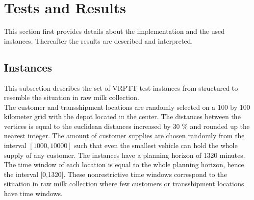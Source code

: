 \section{Tests and Results}
\label{chap:Tests and Results}

This section first provides details about the implementation and the used instances. Thereafter the results are described and interpreted.\\







\subsection{Instances}


This subsection describes the set of VRPTT test instances  from \cite{drexl2014bandc}   structured to resemble the situation in raw milk collection.
\\

The customer and transshipment locations are randomly selected on a 100 by 100 kilometer grid with the depot located in the center.
The distances between the vertices is equal to the euclidean distances increased by 30 \% and rounded up the nearest integer.
%
The amount of customer supplies are chosen randomly from the interval $[1000 , 10000]$ such that even the smallest vehicle can hold the whole supply of any customer.
%
The instances have a planning horizon of 1320 minutes.
The time window of each location is equal to the whole planning horizon, hence the interval [0,1320].
These nonrestrictive time windows correspond to
the situation in raw milk collection where  few
customers or transshipment locations have time windows. \\

